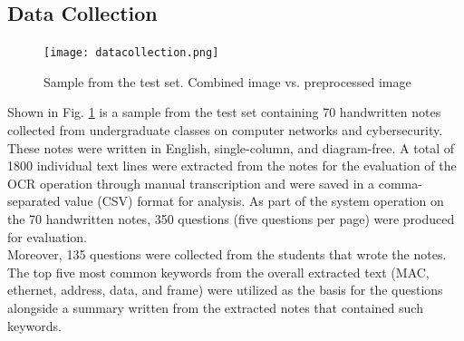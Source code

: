 \documentclass[conference]{IEEEtran}
\begin{document}
\subsection{Data Collection}
\vspace{-0.2cm}
\begin{figure}[H]
\centerline{\texttt{[image: datacollection.png]}}
\vspace{-0.3cm}
\caption{Sample from the test set. Combined image vs. preprocessed image} 
\label{datacollection}
\end{figure}
\indent Shown in Fig. \ref{datacollection} is a sample 
from the test set containing 70 handwritten notes collected from undergraduate
classes on computer networks and cybersecurity. These notes were
written in English, single-column, and diagram-free. A total of
1800 individual text lines were extracted from the notes for the
evaluation of the OCR operation through manual transcription
and were saved in a comma-separated value (CSV) format for 
analysis. As part of the system operation on the 70 handwritten notes, 
350 questions (five questions per page) were produced for 
evaluation. \\
\indent Moreover, 135 questions were collected from the students that wrote the 
notes. The top five most common keywords from the overall extracted text 
(MAC, ethernet, address, data, and frame) were utilized as the basis 
for the questions alongside a summary written from the extracted notes 
that contained such keywords. 
\end{document}
